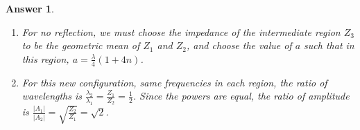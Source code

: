 \documentclass[a4paper]{article}
\newtheorem{ans}{Answer}[subsection]
\theoremstyle{new}
\begin{document}
\begin{ans}
\begin{enumerate}[label=(\roman*)]
The standing wave ratio (SWR) is a ratio of the instantaneous amplitude at $x=0$ and $t=\frac{\arg(\psi_0)}{\omega}$ to that at $2kx=\frac{\pi}{2}$ and when $kx-\omega t+\arg(\psi_0)$. Hence, SWR is 
$$\frac{4/3-2/3}{4/3}=\frac{1}{2}$$
while the transmission coefficient is $\tau=1+r=\frac{2}{3}$.
\item For no reflection, we must choose the impedance of the intermediate region $Z_3$ to be the geometric mean of $Z_1$ and $Z_2$, and choose the value of $a$ such that in this region, $a=\frac{\lambda}{4}(1+4n)$.
\item For this new configuration, same frequencies in each region, the ratio of wavelengths is $\frac{\lambda_2}{\lambda_1}=\frac{Z_1}{Z_2}=\frac{1}{2}$. Since the powers are equal, the ratio of amplitude is $\frac{|A_1|}{|A_2|}=\sqrt{\frac{Z_2}{Z_1}}=\sqrt{2}$.
\end{enumerate}
\end{ans}
\newpage
\end{document}
